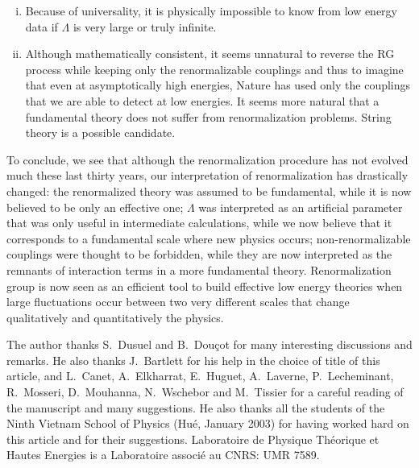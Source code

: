 \documentclass[floatfix,preprintnumbers,amsmath,amssymb,prb,12pt]{revtex4-1}
\begin{document}
{{\begin{enumerate}[(i)]
\item Because of universality, it is physically impossible to know from low
energy data if $\Lambda$ is very large or truly infinite.

\item Although mathematically consistent, it seems unnatural to
reverse the RG process while keeping only the renormalizable
couplings and thus to imagine that even at asymptotically high
energies, Nature has used only the couplings that we are able to
detect at low energies. It seems more natural that a fundamental
theory does not suffer from renormalization problems. String
theory is a possible candidate.\cite{schmidhuber97}

\end{enumerate}

To conclude, we see that although the renormalization procedure has
not evolved much these last thirty years, our interpretation of 
renormalization has drastically changed\cite{lepage89}: the
renormalized theory was assumed to be fundamental, while it is now
believed to be only an effective one; $\Lambda$ was interpreted as
an artificial parameter that was only useful in intermediate
calculations, while we now believe that it corresponds to a
fundamental scale where new physics occurs; non-renormalizable
couplings were thought to be forbidden, while they are now
interpreted as the remnants of interaction terms in a more
fundamental theory. Renormalization group is now seen as
an efficient tool to build effective low energy theories when
large fluctuations occur between two very different scales that
change qualitatively and quantitatively the physics.

\begin{acknowledgments}
The author thanks S.\ Dusuel and B.\ Dou\c{c}ot for many interesting
discussions and remarks. He also thanks J.\ Bartlett for his help
in the choice of title of this article, and L.\ Canet, A.\
Elkharrat, E.\ Huguet, A.\ Laverne, P.\ Lecheminant, R.\ Mosseri,
D.\ Mouhanna, N.\ Wschebor and M.\ Tissier for a careful reading
of the manuscript and many suggestions. He also thanks all the
students of the Ninth Vietnam School of Physics (Hu\'e, January
2003) for having worked hard on this article and for their
suggestions. Laboratoire de Physique Th\'eorique et Hautes Energies
is a Laboratoire associ\'e au CNRS: UMR 7589.
\end{acknowledgments}

\appendix
}}
\end{document}
